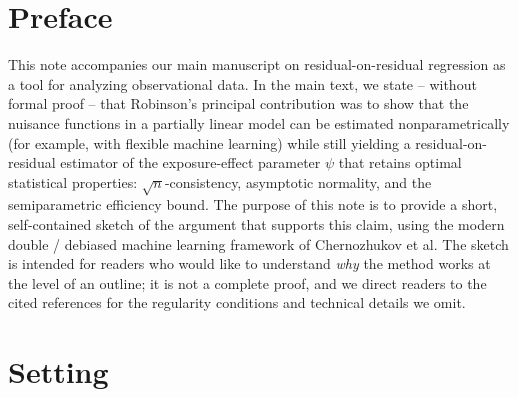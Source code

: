 \documentclass[12pt]{article}
\begin{document}
\doublespacing

\section{Preface}

This note accompanies our main manuscript on residual-on-residual regression as a tool for analyzing observational data.\cite{Robinson1988} In the main text, we state -- without formal proof -- that Robinson's principal contribution was to show that the nuisance functions in a partially linear model can be estimated nonparametrically (for example, with flexible machine learning) while still yielding a residual-on-residual estimator of the exposure-effect parameter $\psi$ that retains optimal statistical properties: $\sqrt{n}$-consistency, asymptotic normality, and the semiparametric efficiency bound. The purpose of this note is to provide a short, self-contained sketch of the argument that supports this claim, using the modern double / debiased machine learning framework of Chernozhukov et al.\cite{Chernozhukov2018} The sketch is intended for readers who would like to understand \emph{why} the method works at the level of an outline; it is not a complete proof, and we direct readers to the cited references for the regularity conditions and technical details we omit.

\section{Setting}
\end{document}
